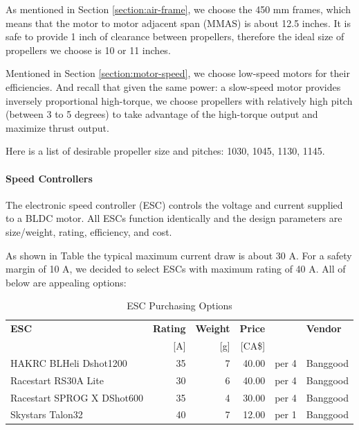 As mentioned in Section \ref{section:air-frame}, we choose the 450 mm frames, which means that the motor to motor 
adjacent span (MMAS) is about 12.5 inches. It is safe to provide 1 inch of clearance between propellers, 
therefore the ideal size of propellers we choose is 10 or 11 inches.

Mentioned in  Section \ref{section:motor-speed}, we choose low-speed motors for their efficiencies. And recall that 
given the same power: a slow-speed motor provides inversely proportional high-torque, we choose propellers 
with relatively high pitch (between 3 to 5 degrees) to take advantage of the high-torque output and 
maximize thrust output.

Here is a list of desirable propeller size and pitches: 1030, 1045, 1130, 1145.

\paragraph{Speed Controllers}

The electronic speed controller (ESC) controls the voltage and current supplied to a BLDC motor. All ESCs 
function identically and the design parameters are size/weight, rating, efficiency, and cost.

As shown in Table \label{table:sunnyskyx2216-table} the typical maximum current draw is about 30 A. For a 
safety margin of 10 A, we decided to select ESCs with maximum rating of 40 A. All of below are appealing 
options:

\begin{table}[H]
    \centering
    \caption{ESC Purchasing Options}
    \label{table:esc-table}

    \begin{tabular}{lrrrll}

    \hline
    \textbf{ESC} & \textbf{Rating} & \textbf{Weight} & \textbf{Price}  & & \textbf{Vendor}\\
    & [A] & [g] & [CA\$] & & \\
    \hline
    HAKRC BLHeli Dshot1200 & 35 & 7  & 40.00 & per 4 & Banggood\\
    Racestart RS30A Lite & 30 & 6  & 40.00 & per 4 & Banggood\\
    Racestart SPROG X DShot600 & 35 & 4  & 30.00 & per 4 & Banggood\\
    Skystars Talon32 & 40 & 7  & 12.00 & per 1 & Banggood\\
    \hline

    \end{tabular} 
\end{table}

